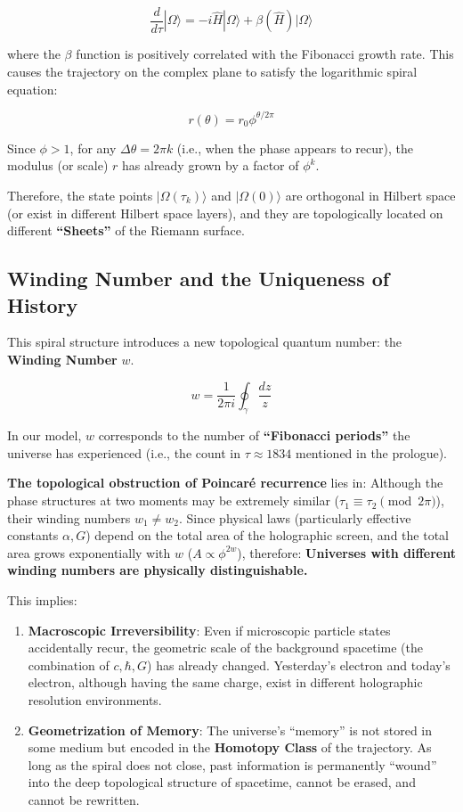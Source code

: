 \[\frac{d}{d\tau} |\Omega\rangle = -i \hat{H} |\Omega\rangle + \beta(\hat{H}) |\Omega\rangle\]

where the $\beta$ function is positively correlated with the Fibonacci growth rate.
This causes the trajectory on the complex plane to satisfy the logarithmic spiral equation:

\[r(\theta) = r_0 \phi^{\theta/2\pi}\]

Since $\phi > 1$, for any $\Delta \theta = 2\pi k$ (i.e., when the phase appears to recur), the modulus (or scale) $r$ has already grown by a factor of $\phi^k$.

Therefore, the state points $|\Omega(\tau_k)\rangle$ and $|\Omega(0)\rangle$ are orthogonal in Hilbert space (or exist in different Hilbert space layers), and they are topologically located on different \textbf{``Sheets''} of the Riemann surface.

\subsection{Winding Number and the Uniqueness of History}

This spiral structure introduces a new topological quantum number: the \textbf{Winding Number} $w$.

\[w = \frac{1}{2\pi i} \oint_{\gamma} \frac{dz}{z}\]

In our model, $w$ corresponds to the number of \textbf{``Fibonacci periods''} the universe has experienced (i.e., the count in $\tau \approx 1834$ mentioned in the prologue).

\textbf{The topological obstruction of Poincar\'{e} recurrence} lies in:
Although the phase structures at two moments may be extremely similar ($\tau_1 \equiv \tau_2 \pmod{2\pi}$), their winding numbers $w_1 \neq w_2$.
Since physical laws (particularly effective constants $\alpha, G$) depend on the total area of the holographic screen, and the total area grows exponentially with $w$ ($A \propto \phi^{2w}$), therefore:
\textbf{Universes with different winding numbers are physically distinguishable.}

This implies:

\begin{enumerate}
\item \textbf{Macroscopic Irreversibility}: Even if microscopic particle states accidentally recur, the geometric scale of the background spacetime (the combination of $c, \hbar, G$) has already changed. Yesterday's electron and today's electron, although having the same charge, exist in different holographic resolution environments.
\item \textbf{Geometrization of Memory}: The universe's ``memory'' is not stored in some medium but encoded in the \textbf{Homotopy Class} of the trajectory. As long as the spiral does not close, past information is permanently ``wound'' into the deep topological structure of spacetime, cannot be erased, and cannot be rewritten.
\end{enumerate}

